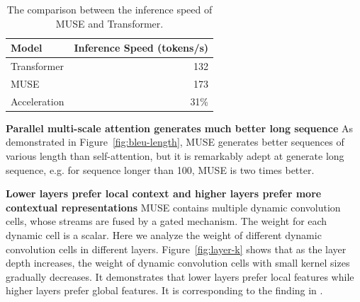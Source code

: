 \documentclass{article} %
\begin{document}
\begin{table}[ht]
\centering
\begin{tabular}{lr}
\toprule
Model  & Inference Speed (tokens/s) \\
\midrule
Transformer  &  132 \\
MUSE  & 173 \\ \midrule
Acceleration & 31\% \\
\bottomrule
\end{tabular}
\caption{The comparison between the inference speed  of  MUSE and Transformer.}
\label{tab:speed}
\end{table}

\textbf{Parallel multi-scale attention generates  much better long sequence}
As demonstrated in Figure~\ref{fig:bleu-length}, MUSE generates better  sequences of various length than self-attention, but it is remarkably adept at generate long sequence, e.g. for sequence longer than 100, MUSE is two times better.

\textbf{Lower layers prefer local context and higher layers prefer more contextual representations}
MUSE contains multiple dynamic convolution cells, whose streams are fused by a gated mechanism. The weight for each dynamic cell is a scalar. Here we analyze the weight of different dynamic convolution cells in different layers.  
Figure~\ref{fig:layer-k} shows that as the layer depth increases, the weight of dynamic convolution cells with small kernel sizes gradually decreases. It demonstrates that lower layers prefer local features while higher layers prefer global features. It is corresponding to the finding in \citet{ramach2019standalone}.

\end{document}
